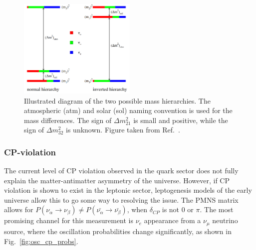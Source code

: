 \begin{figure} %
    \includegraphics[origin=c,width=0.5\textwidth]{diagrams/3-theory/hierarchy.png}
    \caption[Illustration of the two possible mass hierarchies]
    {Illustrated diagram of the two possible mass hierarchies. The atmospheric (atm) and solar
        (sol) naming convention is used for the mass differences. The sign of
        $\Delta m_{21}^{2}$ is small and positive, while the sign of $\Delta m_{32}^{2}$ is
        unknown. Figure taken from Ref.~\cite{gouvea2013}.}
    \label{fig:hierarchy}
\end{figure}

\subsubsection*{CP-violation} %

The current level of CP violation observed in the quark sector does not fully explain the
matter-antimatter asymmetry of the universe. However, if CP violation is shown to exist in the
leptonic sector, leptogenesis models of the early universe allow this to go some way to resolving
the issue. The PMNS matrix allows for $P(\nu_{\alpha}\rightarrow\nu_{\beta}) \neq
    P(\bar{\nu_{\alpha}}\rightarrow\bar{\nu_{\beta}})$, when $\delta_{CP}$ is not 0 or $\pi$. The most
promising channel for this measurement is $\nu_{e}$ appearance from a $\nu_{\mu}$ neutrino source,
where the oscillation probabilities change significantly, as shown in Fig.~\ref{fig:osc_cp_probs}.

